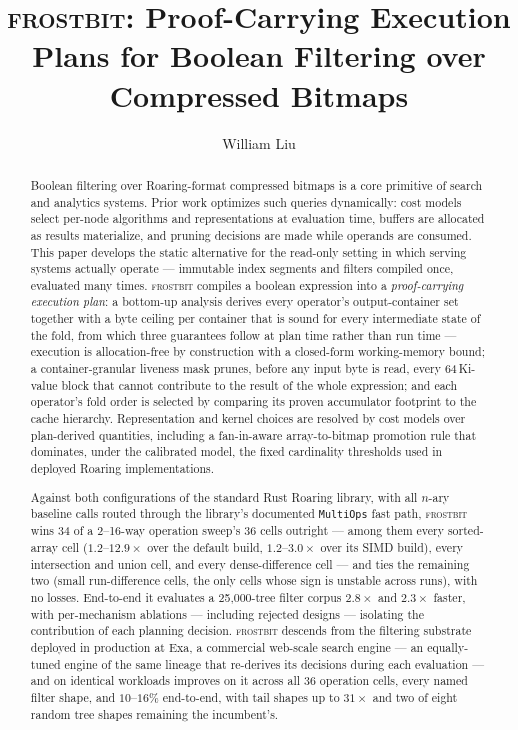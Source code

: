 \documentclass[sigconf,nonacm]{acmart}
\newcommand{\fb}{\textsc{frostbit}}
\begin{document}
\title{\fb: Proof-Carrying Execution Plans for Boolean Filtering over
Compressed Bitmaps}

\author{William Liu}

\begin{abstract}
Boolean filtering over Roaring-format compressed bitmaps is a core
primitive of search and analytics systems. Prior work optimizes such
queries dynamically: cost models select per-node algorithms and
representations at evaluation time, buffers are allocated as results
materialize, and pruning decisions are made while operands are consumed.
This paper develops the static alternative for the read-only setting in
which serving systems actually operate --- immutable index segments and
filters compiled once, evaluated many times. \fb{} compiles a boolean
expression into a \emph{proof-carrying execution plan}: a bottom-up
analysis derives every operator's output-container set together with a
byte ceiling per container that is sound for every intermediate state of
the fold, from which three guarantees follow at plan time rather than
run time --- execution is allocation-free by construction with a
closed-form working-memory bound; a container-granular liveness mask
prunes, before any input byte is read, every 64\,Ki-value block that
cannot contribute to the result of the whole expression; and each
operator's fold order is selected by comparing its proven accumulator
footprint to the cache hierarchy. Representation and kernel choices are
resolved by cost models over plan-derived quantities, including a
fan-in-aware array-to-bitmap promotion rule that dominates, under the
calibrated model, the fixed cardinality thresholds used in deployed
Roaring implementations.

Against both configurations of the standard Rust Roaring library, with
all $n$-ary baseline calls routed through the library's documented
\texttt{MultiOps} fast path, \fb{} wins 34 of a 2--16-way operation
sweep's 36 cells outright --- among them every sorted-array cell
($1.2$--$12.9\times$ over the default build, $1.2$--$3.0\times$ over
its SIMD build), every intersection and union cell, and every
dense-difference cell --- and ties the remaining two (small
run-difference cells, the only cells whose sign is unstable across
runs), with no losses. End-to-end it evaluates
a 25{,}000-tree filter corpus $2.8\times$ and $2.3\times$ faster, with
per-mechanism ablations --- including rejected designs --- isolating
the contribution of each planning decision. \fb{} descends from the
filtering substrate deployed in production at Exa, a commercial
web-scale search engine --- an equally-tuned engine of the same
lineage that re-derives its decisions during each evaluation --- and
on identical workloads improves on it across all 36 operation cells,
every named filter shape, and $10$--$16\%$ end-to-end, with tail
shapes up to $31\times$ and two of eight random tree shapes remaining
the incumbent's.
\end{abstract}
\end{document}
